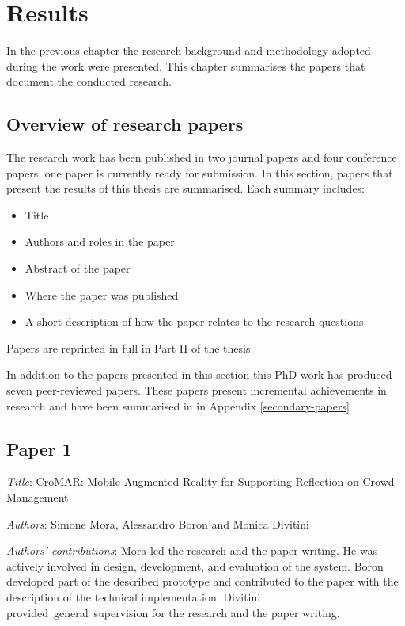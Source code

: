 \chapter{Results}\label{results}


In the previous chapter the research background and methodology adopted during the work were presented. This chapter summarises the papers that document the conducted research.

\section{Overview of research papers}\label{papers}

The research work has been published in two journal papers and four conference papers, one paper is currently ready for submission. In this section, papers that present the results of this thesis are summarised. Each summary includes: 
\begin{itemize}
	\itemsep1pt\parskip0pt 
	\item Title 
	\item Authors and roles in the paper 
	\item Abstract of the paper
	\item Where the paper was published 
	\item A short description of how the paper relates to the research questions
\end{itemize}

Papers are reprinted in full in Part II of the thesis.

In addition to the papers presented in this section this PhD work has produced seven peer-reviewed papers. These papers present incremental achievements in research and have been summarised in in Appendix \ref{secondary-papers}

\section[P1: CroMAR: Mobile Augmented Reality for Supporting Reflection on Crowd Management][Paper 1]{Paper 1} \label{paper-1}

\emph{Title}: CroMAR: Mobile Augmented Reality for Supporting Reflection on Crowd Management

\emph{Authors}: Simone Mora, Alessandro Boron and Monica Divitini

\emph{Authors' contributions}: Mora led the research and the paper writing. He was actively involved in design, development, and evaluation of the system. Boron developed part of the described prototype and contributed to the paper with the description of the technical implementation. Divitini provided~general~supervision for the research and the paper writing. 

